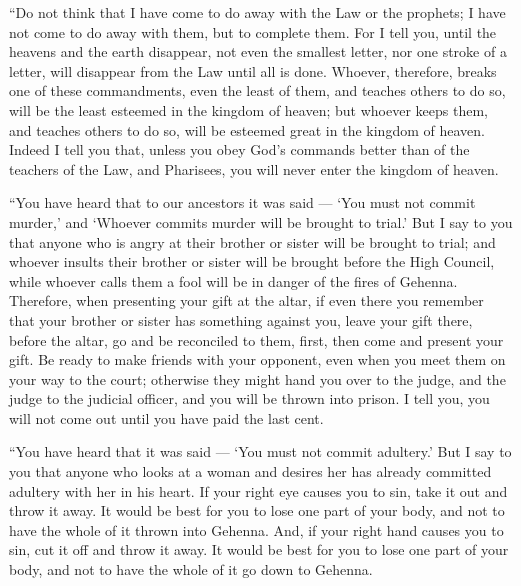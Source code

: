  ``Do not think that I have come to do away with the Law or
the prophets; I have not come to do away with them, but to complete
them.  For I tell you, until the heavens and the earth
disappear, not even the smallest letter, nor one stroke of a letter,
will disappear from the Law until all is done.  Whoever,
therefore, breaks one of these commandments, even the least of them, and
teaches others to do so, will be the least esteemed in the kingdom of
heaven; but whoever keeps them, and teaches others to do so, will be
esteemed great in the kingdom of heaven.  Indeed I tell you
that, unless you obey God's commands better than of the teachers of the
Law, and Pharisees, you will never enter the kingdom of heaven.

 ``You have heard that to our ancestors it was said ---
`You must not commit murder,' and `Whoever commits murder will be
brought to trial.'  But I say to you that anyone who is
angry at their brother or sister will be brought to trial; and whoever
insults their brother or sister will be brought before the High Council,
while whoever calls them a fool will be in danger of the fires of
Gehenna.  Therefore, when presenting your gift at the
altar, if even there you remember that your brother or sister has
something against you,  leave your gift there, before the
altar, go and be reconciled to them, first, then come and present your
gift.  Be ready to make friends with your opponent, even
when you meet them on your way to the court; otherwise they might hand
you over to the judge, and the judge to the judicial officer, and you
will be thrown into prison.  I tell you, you will not come
out until you have paid the last cent.

 ``You have heard that it was said --- `You must not commit
adultery.'  But I say to you that anyone who looks at a
woman and desires her has already committed adultery with her in his
heart.  If your right eye causes you to sin, take it out
and throw it away. It would be best for you to lose one part of your
body, and not to have the whole of it thrown into Gehenna. 
And, if your right hand causes you to sin, cut it off and throw it away.
It would be best for you to lose one part of your body, and not to have
the whole of it go down to Gehenna.

